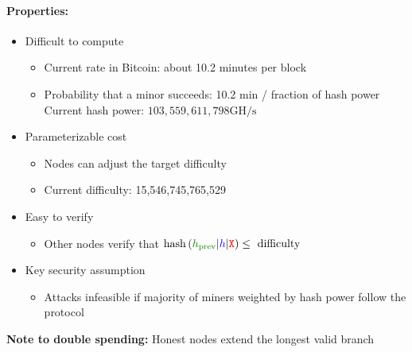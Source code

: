 \paragraph{Properties: }
\begin{itemize}
    \item Difficult to compute
    \begin{itemize}
        \item Current rate in Bitcoin: about 10.2 minutes per block
        \item Probability that a minor succeeds: 10.2 min / fraction of hash power Current hash power: $103,559,611,798 \mathrm{GH} / \mathrm{s}$
    \end{itemize}
    \item Parameterizable cost
    \begin{itemize}
        \item Nodes can adjust the target difficulty
        \item Current difficulty: 15,546,745,765,529
    \end{itemize}{}
    \item Easy to verify
     \begin{itemize}
        \item Other nodes verify that $\operatorname{hash}\left(\textcolor{green}{h_{\text {prev}}}|\textcolor{blue}h|\texttt{\textcolor{red}{X}}\right) \leq \text { difficulty }$

    \end{itemize}{}
    \item Key security assumption
     \begin{itemize}
        \item Attacks infeasible if majority of miners weighted by hash power follow the protocol
    \end{itemize}{}
\end{itemize}{}
\textbf{Note to double spending: } Honest nodes extend the longest valid branch
